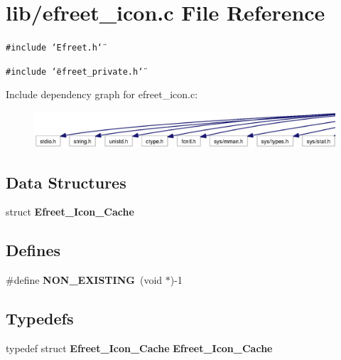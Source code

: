 \section{lib/efreet\_\-icon.c File Reference}
\label{efreet__icon_8c}


{\tt \#include \char`\"{}Efreet.h\char`\"{}}\par
{\tt \#include \char`\"{}efreet\_\-private.h\char`\"{}}\par


Include dependency graph for efreet\_\-icon.c:\nopagebreak
\begin{figure}[H]
\begin{center}
\leavevmode
\includegraphics[width=420pt]{efreet__icon_8c__incl}
\end{center}
\end{figure}
\subsection*{Data Structures}
\begin{CompactItemize}
\item 
struct {\bf Efreet\_\-Icon\_\-Cache}
\end{CompactItemize}
\subsection*{Defines}
\begin{CompactItemize}
\item 
\#define {\bf NON\_\-EXISTING}~(void $\ast$)-1
\end{CompactItemize}
\subsection*{Typedefs}
\begin{CompactItemize}
\item 
typedef struct {\bf Efreet\_\-Icon\_\-Cache} {\bf Efreet\_\-Icon\_\-Cache}
\end{CompactItemize}
